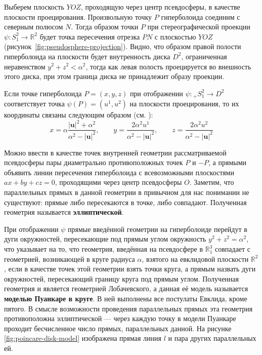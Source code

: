\documentclass{article}
\numberwithin{equation}{section}
\newcommand{\neword}[1]{\textbf{#1}}
\renewcommand{\vec}{\mathbf}
\providecommand{\abs}[1]{\left \lvert{#1}\right \rvert}
\begin{document}
Выберем плоскость $YOZ$, проходящую через центр псевдосферы, в
качестве плоскости проецирования. Произвольную точку $P$ гиперболоида
соединим с северным полюсом $N$. Тогда образом точки $P$ при
стереографической проекции $\psi \colon S^2_1 \to \mathbb{R}^2$ будет
точка пересечения отрезка $PN$ с плоскостью $YOZ$
(рисунок \ref{fig:pseudosphere-projection}). Видно, что образом правой
полости гиперболоида на плоскости будет внутренность диска $D^2$,
ограниченная неравенством $y^2 + z^2 < \alpha^2$, тогда как левая
полость проецируется во внешность этого диска, при этом граница диска
не принадлежит образу проекции.

Если точке гиперболоида $P = (x, y, z)$ при отображении $\psi \colon
{}_+S^2_1 \to D^2$ соответствует точка $\psi(P) = (u^1, u^2)$ на
плоскости проецирования, то их координаты связаны следующим образом
(см. \cite{fomenko00}):
\begin{equation}\label{eq:hyperboloid-to-plane}
  x = \alpha\frac{\abs{\vec{u}}^2 + \alpha^2}{\alpha^2 -
    \abs{\vec{u}}^2}, \qquad
  y = \frac{2 \alpha^2 u^1}{\alpha^2 - \abs{\vec{u}}^2}, \qquad
  z = \frac{2 \alpha^2 u^2}{\alpha^2 - \abs{\vec{u}}^2}
\end{equation}

Можно ввести в качестве точек внутренней геометрии рассматриваемой
псевдосферы пары диаметрально противоположных точек $P$ и $-P$, а
прямыми объявить линии пересечения гиперболоида с всевозможными
плоскостями $ax+by+cz=0$, проходящими через центр псевдосферы $O$.
Заметим, что параллельных прямых в данной геометрии в привычном для
нас понимании не существуют: прямые либо пересекаются в точке, либо
совпадают. Полученная геометрия называется \neword{эллиптической}.

При отображении $\psi$ прямые введённой геометрии на гиперболоиде
перейдут в дуги окружностей, пересекающие под прямым углом окружность
$y^2 + z^2 = \alpha^2$, что указывает на то, что геометрия, введённая
на псевдосфере в $\mathbb{R}^3_1$ совпадает с геометрией, возникающей
в круге радиуса $\alpha$, взятого на евклидовой плоскости
$\mathbb{R}^2$, если в качестве точек этой геометрии взять точки
круга, а прямым назвать дуги окружностей, пересекающий границу круга
под прямым углом. Полученная геометрия и является геометрией
Лобачевского, а данная её модель называется \neword{моделью Пуанкаре в
  круге}. В ней выполнены все постулаты Евклида, кроме пятого. В
смысле возможности проведения параллельных прямых эта геометрия
противоположна эллиптической — через каждую точку в модели Пуанкаре
проходит бесчисленное число прямых, параллельных данной. На рисунке
\ref{fig:poincare-disk-model} изображена прямая линия $l$ и пара
других параллельных ей.
\end{document}

